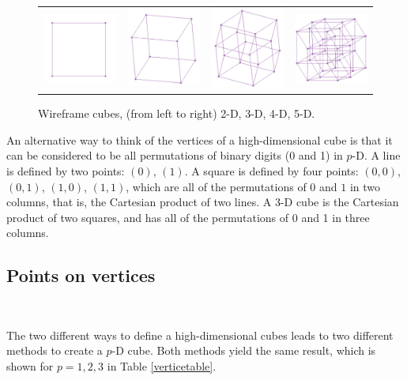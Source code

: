 \begin{figure}[ht]
\centering
\begin{tabular}{cccc}
\includegraphics[width=1in]{fig/cube2D.pdf} & \includegraphics[width=1in]{fig/cube3D.pdf} &
\includegraphics[width=1in]{fig/cube4D.pdf} & \includegraphics[width=1in]{fig/cube5D.pdf}
\end{tabular}
\caption{Wireframe cubes, (from left to right) 2-D, 3-D, 4-D, 5-D.}
\label{boxes}
\end{figure}

An alternative way to think of the vertices of a high-dimensional cube is that it can
be considered to be all permutations of binary digits (0 and 1) in
$p$-D. A line is defined by two points: $(0)$, $(1)$. A square is
defined by four points: $(0,0)$, $(0,1)$, $(1,0)$, $(1,1)$, which are
all of the permutations of $0$ and $1$ in two columns, that is, the
Cartesian product of two lines. A 3-D cube is the Cartesian product of
two squares, and has all of the permutations of 0 and 1 in three
columns.

\subsection{Points on vertices}~\label{cube-vertices}

The two different ways to define a high-dimensional cubes leads to two
different methods to create a $p$-D cube. Both methods yield the same
result, which is shown for $p=1,2,3$ in Table \ref{verticetable}.

